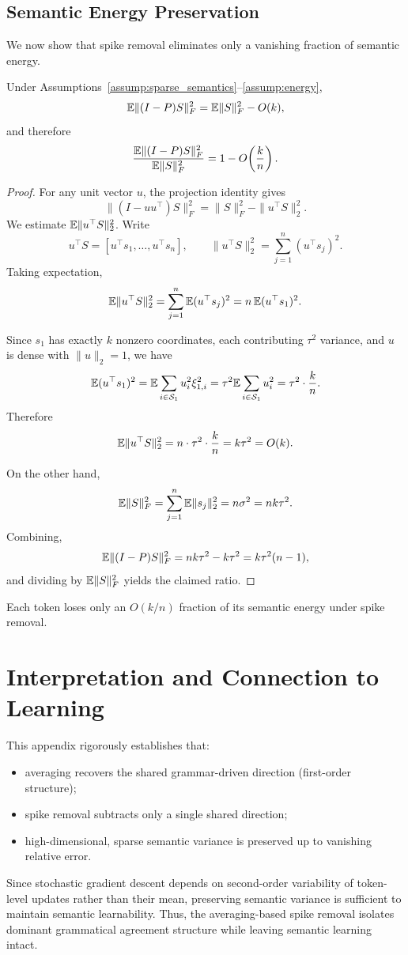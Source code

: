 \subsection{Semantic Energy Preservation}

We now show that spike removal eliminates only a vanishing fraction of semantic
energy.

\begin{theorem}
\label{thm:semantic_energy_preserved}
Under Assumptions~\ref{assump:sparse_semantics}--\ref{assump:energy},
\[
\mathbb{E}\|(I-P)S\|_F^2
=
\mathbb{E}\|S\|_F^2 - O(k),
\]
and therefore
\[
\frac{\mathbb{E}\|(I-P)S\|_F^2}{\mathbb{E}\|S\|_F^2}
=
1 - O\!\left(\frac{k}{n}\right).
\]
\end{theorem}

\begin{proof}
For any unit vector $u$, the projection identity gives
\[
\|(I-uu^\top)S\|_F^2 = \|S\|_F^2 - \|u^\top S\|_2^2.
\]
We estimate $\mathbb{E}\|u^\top S\|_2^2$.
Write
\[u^\top S = [u^\top s_1,\dots,u^\top s_n],
\qquad
\|u^\top S\|_2^2 = \sum_{j=1}^n (u^\top s_j)^2.
\]
Taking expectation,
\[
\mathbb{E}\|u^\top S\|_2^2
=
\sum_{j=1}^n \mathbb{E}(u^\top s_j)^2
=
n\, \mathbb{E}(u^\top s_1)^2.
\]

Since $s_1$ has exactly $k$ nonzero coordinates, each contributing $\tau^2$ variance,
and $u$ is dense with $\|u\|_2=1$, we have
\[
\mathbb{E}(u^\top s_1)^2
=
\mathbb{E}\sum_{i\in\mathcal{S}_1} u_i^2 \xi_{1,i}^2
=
\tau^2 \mathbb{E}\sum_{i\in\mathcal{S}_1} u_i^2
=
\tau^2 \cdot \frac{k}{n}.
\]
Therefore
\[
\mathbb{E}\|u^\top S\|_2^2 = n \cdot \tau^2 \cdot \frac{k}{n} = k\tau^2 = O(k).
\]

On the other hand,
\[
\mathbb{E}\|S\|_F^2 = \sum_{j=1}^n \mathbb{E}\|s_j\|_2^2 = n\sigma^2 = nk\tau^2.
\]
Combining,
\[
\mathbb{E}\|(I-P)S\|_F^2
=
nk\tau^2 - k\tau^2
=
k\tau^2(n-1),
\]
and dividing by $\mathbb{E}\|S\|_F^2$ yields the claimed ratio.
\end{proof}

\begin{corollary}
Each token loses only an $O(k/n)$ fraction of its semantic energy under spike removal.
\end{corollary}

\section{Interpretation and Connection to Learning}

This appendix rigorously establishes that:
\begin{itemize}
\item averaging recovers the shared grammar-driven direction (first-order structure);
\item spike removal subtracts only a single shared direction;
\item high-dimensional, sparse semantic variance is preserved up to vanishing
      relative error.
\end{itemize}

Since stochastic gradient descent depends on second-order variability of token-level
updates rather than their mean, preserving semantic variance is sufficient to
maintain semantic learnability.
Thus, the averaging-based spike removal isolates dominant grammatical agreement
structure while leaving semantic learning intact.
